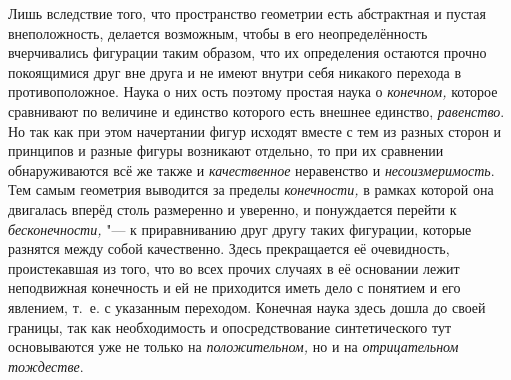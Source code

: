 Лишь вследствие того, что пространство геометрии есть
абстрактная и пустая внеположность, делается возможным, чтобы в
его неопределённость вчерчивались фигурации таким образом,
что их определения остаются прочно покоящимися друг вне друга и не имеют
внутри себя никакого перехода в противоположное. Наука о них ость поэтому
простая наука о {\em конечном,}
которое сравнивают по величине и единство которого есть
внешнее единство, {\em равенство}.
Но так как при этом начертании фигур исходят вместе с тем из
разных сторон и принципов и разные фигуры возникают отдельно, то при их
сравнении обнаруживаются всё же также и
{\em качественное}
неравенство и
{\em несоизмеримость}.
Тем самым геометрия выводится за пределы
{\em конечности,} в
рамках которой она двигалась вперёд столь размеренно и уверенно, и
понуждается перейти к
{\em бесконечности,} "--- к
приравниванию друг другу таких фигурации, которые разнятся между собой
качественно. Здесь прекращается её очевидность, проистекавшая из того, что
во всех прочих случаях в её основании лежит неподвижная конечность и ей не
приходится иметь дело с понятием и его явлением, т.~е. с указанным
переходом. Конечная наука здесь дошла до своей границы, так как
необходимость и опосредствование синтетического тут основываются уже не
только на {\em положительном,} но и на {\em отрицательном тождестве}.

